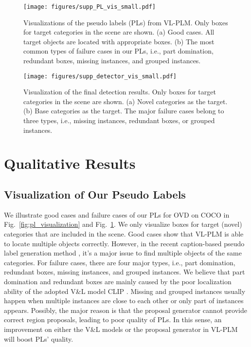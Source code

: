\documentclass[runningheads]{llncs}
\begin{document}
\begin{figure}[t]\centering
    \texttt{[image: figures/supp\_PL\_vis\_small.pdf]}
\caption{Visualizations of the pseudo labels (PLs) from VL-PLM. Only boxes for target categories in the scene are shown. (a) Good cases. All target objects are located with appropriate boxes. (b) The most common types of failure cases in our PLs, i.e., part domination, redundant boxes, missing instances, and grouped instances.}
    \label{fig:pl_vis}
\end{figure}

\begin{figure}[t]\centering
    \texttt{[image: figures/supp\_detector\_vis\_small.pdf]}
    \vspace{-0.4cm}
    \caption{Visualization of the final detection results. Only boxes for target categories in the scene are shown. (a) Novel categories as the target. (b) Base categories as the target. The major failure cases belong to three types, i.e., missing instances, redundant boxes, or grouped instances.}
    \label{fig:detector_vis}
\end{figure}


\section{Qualitative Results} \label{sec:vis}

\subsection{Visualization of Our Pseudo Labels}

We illustrate good cases and failure cases of our PLs for OVD on COCO in Fig.~\ref{fig:pl_visualization} and Fig.~\ref{fig:pl_vis}. We only visualize boxes for target (novel) categories that are included in the scene. 
Good cases show that VL-PLM is able to locate multiple objects correctly. However, in the recent caption-based pseudo label generation method \cite{gao2021open}, it's a major issue to find multiple objects of the same categories.
For failure cases, there are four major types, i.e., part domination, redundant boxes, missing instances, and grouped instances. 
We believe that part domination and redundant boxes are mainly caused by the poor localization ability of the adopted V\&L model CLIP \cite{radford_arxiv_2021}. 
Missing and grouped instances usually happen when multiple instances are close to each other or only part of instances appears. Possibly, the major reason is that the proposal generator cannot provide correct region proposals, leading to poor quality of PLs. 
In this sense, an improvement on either the V\&L models or the proposal generator in VL-PLM will boost PLs' quality.
\end{document}
